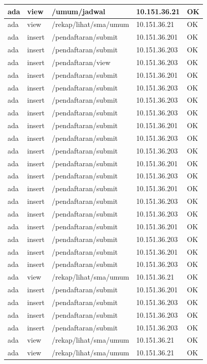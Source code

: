\documentclass{ta-its}
\begin{document}
\begin{longtable}{|p{}|p{}|p{}|p{}|p{}|}
						ada & view & /umum/jadwal & 10.151.36.21 & OK\\ \hline
						ada & view & /rekap/lihat/sma/umum & 10.151.36.21 & OK\\ \hline
						ada & insert & /pendaftaran/submit & 10.151.36.201 & OK\\ \hline
						ada & insert & /pendaftaran/submit & 10.151.36.203 & OK\\ \hline
						ada & insert & /pendaftaran/view & 10.151.36.203 & OK\\ \hline
						ada & insert & /pendaftaran/submit & 10.151.36.201 & OK\\ \hline
						ada & insert & /pendaftaran/submit & 10.151.36.203 & OK\\ \hline
						ada & insert & /pendaftaran/submit & 10.151.36.203 & OK\\ \hline
						ada & insert & /pendaftaran/submit & 10.151.36.203 & OK\\ \hline
						ada & insert & /pendaftaran/submit & 10.151.36.201 & OK\\ \hline
						ada & insert & /pendaftaran/submit & 10.151.36.203 & OK\\ \hline
						ada & insert & /pendaftaran/submit & 10.151.36.203 & OK\\ \hline
						ada & insert & /pendaftaran/submit & 10.151.36.201 & OK\\ \hline
						ada & insert & /pendaftaran/submit & 10.151.36.203 & OK\\ \hline
						ada & insert & /pendaftaran/submit & 10.151.36.201 & OK\\ \hline
						ada & insert & /pendaftaran/submit & 10.151.36.203 & OK\\ \hline
						ada & insert & /pendaftaran/submit & 10.151.36.203 & OK\\ \hline
						ada & insert & /pendaftaran/submit & 10.151.36.201 & OK\\ \hline
						ada & insert & /pendaftaran/submit & 10.151.36.203 & OK\\ \hline
						ada & insert & /pendaftaran/submit & 10.151.36.201 & OK\\ \hline
						ada & insert & /pendaftaran/submit & 10.151.36.203 & OK\\ \hline
						ada & view & /rekap/lihat/sma/umum & 10.151.36.21 & OK\\ \hline
						ada & insert & /pendaftaran/submit & 10.151.36.201 & OK\\ \hline
						ada & insert & /pendaftaran/submit & 10.151.36.203 & OK\\ \hline
						ada & insert & /pendaftaran/submit & 10.151.36.203 & OK\\ \hline
						ada & insert & /pendaftaran/submit & 10.151.36.203 & OK\\ \hline
						ada & view & /rekap/lihat/sma/umum & 10.151.36.21 & OK\\ \hline
						ada & view & /rekap/lihat/sma/umum & 10.151.36.21 & OK\\ \hline
						
						
					\end{longtable}
					
\end{document}
